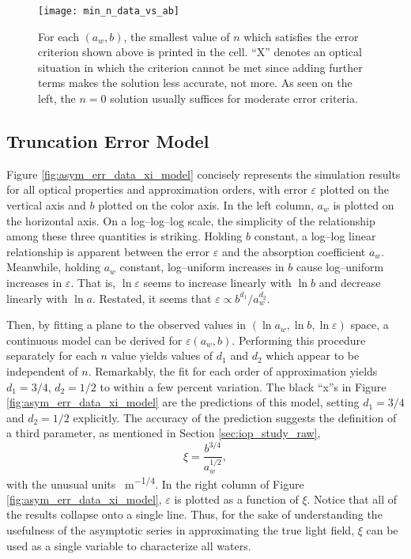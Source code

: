 \begin{figure}[h]
  \centering
  \texttt{[image: min\_n\_data\_vs\_ab]}
  \caption{For each $(a_w,b)$, the smallest value of $n$ which satisfies the error criterion shown above is printed in the cell. ``X'' denotes an optical situation in which the criterion cannot be met since adding further terms makes the solution less accurate, not more. As seen on the left, the $n=0$ solution usually suffices for moderate error criteria.}
  \label{fig:min_n_data_vs_ab}
\end{figure}

\subsection{Truncation Error Model}
Figure \ref{fig:asym_err_data_xi_model} concisely represents the simulation results for all optical properties and approximation orders, with error $\varepsilon$ plotted on the vertical axis and $b$ plotted on the color axis.
In the left column, $a_w$ is plotted on the horizontal axis.
On a log--log--log scale, the simplicity of the relationship among these three quantities is striking.
Holding $b$ constant, a log--log linear relationship is apparent between the error $\varepsilon$ and the absorption coefficient $a_w$.
Meanwhile, holding $a_w$ constant, log--uniform increases in $b$ cause log--uniform increases in $\varepsilon$.
That is, $\ln\varepsilon$ seems to increase linearly with $\ln b$ and decrease linearly with $\ln a$.
Restated, it seems that $\varepsilon \propto b^{d_1}/a_w^{d_2}$.

Then, by fitting a plane to the observed values in $(\ln a_w, \ln b, \ln \varepsilon)$ space, a continuous model can be derived for $\varepsilon(a_w, b)$.
Performing this procedure separately for each $n$ value yields values of $d_1$ and $d_2$ which appear to be independent of $n$.
Remarkably, the fit for each order of approximation yields $d_1=3/4$, $d_2=1/2$ to within a few percent variation.
The black ``x''s in Figure \ref{fig:asym_err_data_xi_model} are the predictions of this model, setting $d_1=3/4$ and $d_2=1/2$ explicitly.
The accuracy of the prediction suggests the definition of a third parameter, as mentioned in Section \ref{sec:iop_study_raw},
\begin{equation}
  \label{eqn:xi}
  \xi = \frac{b^{3/4}}{a_w^{1/2}},
\end{equation}
with the unusual units \SI{}{\m^{-1/4}}.
In the right column of Figure \ref{fig:asym_err_data_xi_model}, $\varepsilon$ is plotted as a function of $\xi$.
Notice that all of the results collapse onto a single line.
Thus, for the sake of understanding the usefulness of the asymptotic series in approximating the true light field, $\xi$ can be used as a single variable to characterize all waters.

